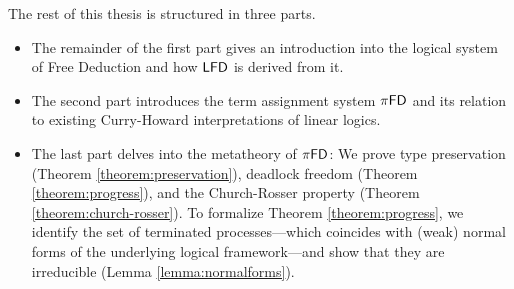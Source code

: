 The rest of this thesis is structured in three parts.
\begin{itemize}
  \item The remainder of the first part gives an introduction into the logical system
        of Free Deduction and how $\textsf{LFD}$ is derived from it.
  \item The second part introduces the term assignment system $\pi\textsf{FD}$ and its relation
        to existing Curry-Howard interpretations of linear logics.
  \item The last part delves into the metatheory of $\pi\textsf{FD}$: We prove type
        preservation (Theorem \ref{theorem:preservation}), deadlock freedom
        (Theorem \ref{theorem:progress}), and the Church-Rosser property
        (Theorem \ref{theorem:church-rosser}). To formalize Theorem \ref{theorem:progress},
        we identify the set of terminated processes---which coincides with (weak) normal forms
        of the underlying logical framework---and show that they are irreducible (Lemma \ref{lemma:normalforms}).
\end{itemize}